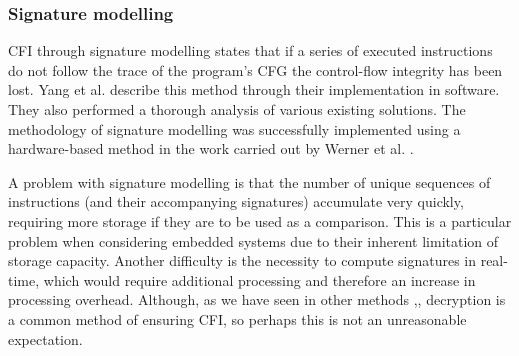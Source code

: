 \subsubsection*{Signature modelling}
CFI through signature modelling states that if a series of executed instructions do not follow the trace of the program's CFG the control-flow integrity has been lost. Yang et al. \cite{Yang2013} describe this method through their implementation in software. They also performed a thorough analysis of various existing solutions. The methodology of signature modelling was successfully implemented using a hardware-based method in the work carried out by Werner et al. \cite{Werner2016}.

A problem with signature modelling is that the number of unique sequences of instructions (and their accompanying signatures) accumulate very quickly, requiring more storage if they are to be used as a comparison. This is a particular problem when considering embedded systems due to their inherent limitation of storage capacity. Another difficulty is the necessity to compute signatures in real-time, which would require additional processing and therefore an increase in processing overhead. Although, as we have seen in other methods \cite{Davi2015},\cite{Lee2019}, decryption is a common method of ensuring CFI, so perhaps this is not an unreasonable expectation.

